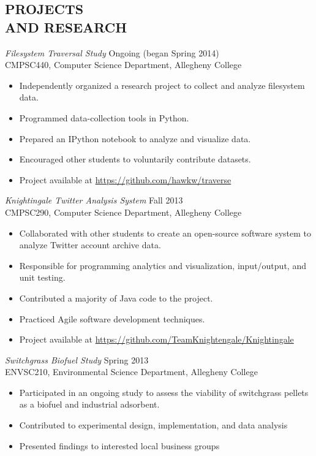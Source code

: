 \documentclass[line,margin]{res}
\begin{document}
\begin{resume}
\section{PROJECTS \\ AND RESEARCH}
        
                {\sl Filesystem Traversal Study} \hfill Ongoing (began Spring 2014) \\
                CMPSC440, Computer Science Department, Allegheny College
                 \begin{itemize}  \itemsep -2pt %
                    \item Independently organized a research project to collect and analyze filesystem data.
                    \item Programmed data-collection tools in Python.
                    \item Prepared an IPython notebook to analyze and visualize data.
                    \item Encouraged other students to voluntarily contribute datasets.
                    \item Project available at \url{https://github.com/hawkw/traverse}
                \end{itemize}

                {\sl Knightingale Twitter Analysis System} \hfill Fall 2013 \\
                CMPSC290, Computer Science Department, Allegheny College
                 \begin{itemize}  \itemsep -2pt %
                    \item Collaborated with other students to create an open-source software system to analyze Twitter account archive data.
                    \item Responsible for programming analytics and visualization, input/output, and unit testing.
                    \item Contributed a majority of Java code to the project.
                    \item Practiced Agile software development techniques.
                    \item Project available at \url{https://github.com/TeamKnightengale/Knightingale}
                \end{itemize}

                {\sl Switchgrass Biofuel Study} \hfill Spring 2013 \\
                ENVSC210, Environmental Science Department, Allegheny College
                 \begin{itemize}  \itemsep -2pt %
                    \item Participated in an ongoing study to assess the viability of switchgrass pellets as a biofuel and industrial adsorbent.
                    \item Contributed to experimental design, implementation, and data analysis
                    \item Presented findings to interested local business groups
                \end{itemize}


\end{resume}
\end{document}
